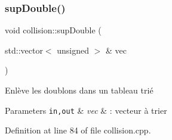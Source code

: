 \mbox{\label{namespacecollision_a451676809547856fc6f86b3dd6dc7c23}} 
\subsubsection{\texorpdfstring{sup\+Double()}{supDouble()}}
{\footnotesize\ttfamily void collision\+::sup\+Double (\begin{DoxyParamCaption}\item[{std\+::vector$<$ unsigned $>$ \&}]{vec }\end{DoxyParamCaption})}



Enlève les doublons dans un tableau trié 


\begin{DoxyParams}[1]{Parameters}
\mbox{\tt in,out}  & {\em vec} & \+: vecteur à trier \\
\hline
\end{DoxyParams}


Definition at line 84 of file collision.\+cpp.

